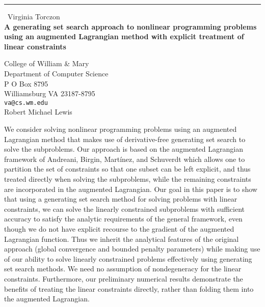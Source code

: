 \documentclass{report}
\begin{document}
\begin{center}
\rule{6in}{1pt} \
{\large Virginia Torczon \\
{\bf A generating set search approach to nonlinear programming problems using an augmented Lagrangian method with explicit treatment of linear constraints}}

College of William & Mary \\ Department of Computer Science \\ P O Box 8795 \\ Williamsburg VA 23187-8795
\\
{\tt va@cs.wm.edu}\\
Robert Michael Lewis\end{center}

We consider solving nonlinear programming problems using an augmented
Lagrangian method that makes use of derivative-free generating set search
to solve the subproblems. Our approach is based on the augmented
Lagrangian framework of Andreani, Birgin, Mart\'{i}nez, and Schuverdt
which allows one to partition the set of constraints so that one subset
can be left explicit, and thus treated directly when solving the
subproblems, while the remaining constraints are incorporated in the
augmented Lagrangian. Our goal in this paper is to show that using a
generating set search method for solving problems with linear
constraints, we can solve the linearly constrained subproblems with
sufficient accuracy to satisfy the analytic requirements of the general
framework, even though we do not have explicit recourse to the gradient
of the augmented Lagrangian function. Thus we inherit the analytical
features of the original approach (global convergence and bounded penalty
parameters) while making use of our ability to solve linearly constrained
problems effectively using generating set search methods. We need no
assumption of nondegeneracy for the linear constraints. Furthermore, our
preliminary numerical results demonstrate the benefits of treating the
linear constraints directly, rather than folding them into the augmented
Lagrangian.
\end{document}
